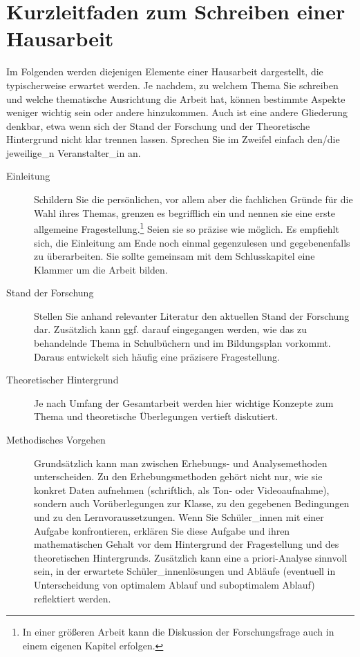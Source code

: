 \documentclass[ngerman,oneside,12pt,a4paper]{scrbook}
\begin{document}
\section{Kurzleitfaden zum Schreiben einer
Hausarbeit}\label{kurzleitfaden-zum-schreiben-einer-hausarbeit}

Im Folgenden werden diejenigen Elemente einer Hausarbeit dargestellt,
die typischerweise erwartet werden. Je nachdem, zu welchem Thema Sie
schreiben und welche thematische Ausrichtung die Arbeit hat, können
bestimmte Aspekte weniger wichtig sein oder andere hinzukommen. Auch ist
eine andere Gliederung denkbar, etwa wenn sich der Stand der Forschung
und der Theoretische Hintergrund nicht klar trennen lassen. Sprechen Sie
im Zweifel einfach den/die jeweilige\_n Veranstalter\_in an.

\begin{description}
\item[Einleitung]
Schildern Sie die persönlichen, vor allem aber die fachlichen Gründe für
die Wahl ihres Themas, grenzen es begrifflich ein und nennen sie eine
erste allgemeine Fragestellung.\footnote{In einer größeren Arbeit kann
  die Diskussion der Forschungsfrage auch in einem eigenen Kapitel
  erfolgen.} Seien sie so präzise wie möglich. Es empfiehlt sich, die
Einleitung am Ende noch einmal gegenzulesen und gegebenenfalls zu
überarbeiten. Sie sollte gemeinsam mit dem Schlusskapitel eine Klammer
um die Arbeit bilden.
\item[Stand der Forschung]
Stellen Sie anhand relevanter Literatur den aktuellen Stand der
Forschung dar. Zusätzlich kann ggf. darauf eingegangen werden, wie das
zu behandelnde Thema in Schulbüchern und im Bildungsplan vorkommt.
Daraus entwickelt sich häufig eine präzisere Fragestellung.
\item[Theoretischer Hintergrund]
Je nach Umfang der Gesamtarbeit werden hier wichtige Konzepte zum Thema
und theoretische Überlegungen vertieft diskutiert.
\item[Methodisches Vorgehen]
Grundsätzlich kann man zwischen Erhebungs- und Analysemethoden
unterscheiden. Zu den Erhebungsmethoden gehört nicht nur, wie sie
konkret Daten aufnehmen (schriftlich, als Ton- oder Videoaufnahme),
sondern auch Vorüberlegungen zur Klasse, zu den gegebenen Bedingungen
und zu den Lernvoraussetzungen. Wenn Sie Schüler\_innen mit einer
Aufgabe konfrontieren, erklären Sie diese Aufgabe und ihren
mathematischen Gehalt vor dem Hintergrund der Fragestellung und des
theoretischen Hintergrunds. Zusätzlich kann eine a priori-Analyse
sinnvoll sein, in der erwartete Schüler\_innenlösungen und Abläufe
(eventuell in Unterscheidung von optimalem Ablauf und suboptimalem
Ablauf) reflektiert werden.


\end{description}
\end{document}
